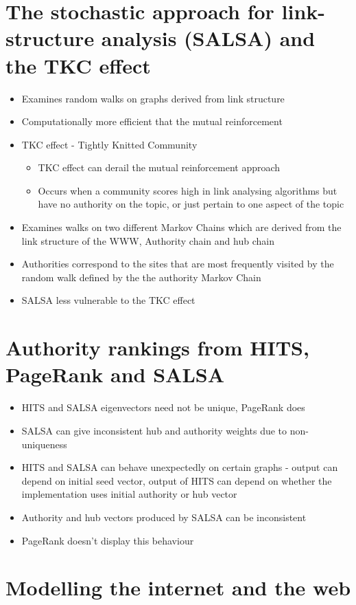 \documentclass[11pt]{report}
\begin{document}
\section{The stochastic approach for link-structure analysis (SALSA) and the TKC effect}
\begin{itemize}
\item Examines random walks on graphs derived from link structure
\item Computationally more efficient that the mutual reinforcement
\item TKC effect - Tightly Knitted Community
\begin{itemize}
\item TKC effect can derail the mutual reinforcement approach
\item Occurs when a community scores high in link analysing algorithms but have no authority on the topic, or just pertain to one aspect of the topic
\end{itemize}
\item Examines walks on two different Markov Chains which are derived from the link structure of the WWW, Authority chain and hub chain
\item Authorities correspond to the sites that are most frequently visited by the random walk defined by the the authority Markov Chain
\item SALSA less vulnerable to the TKC effect
\end{itemize}
\section{Authority rankings from HITS, PageRank and SALSA}
\begin{itemize}
\item HITS and SALSA eigenvectors need not be unique, PageRank does
\item SALSA can give inconsistent hub and authority weights due to non-uniqueness
\item HITS and SALSA can behave unexpectedly on certain graphs - output can depend on initial seed vector, output of HITS can depend on whether the implementation uses initial authority or hub vector
\item Authority and hub vectors produced by SALSA can be inconsistent
\item PageRank doesn't display this behaviour
\end{itemize}
\section{Modelling the internet and the web}
\end{document}
